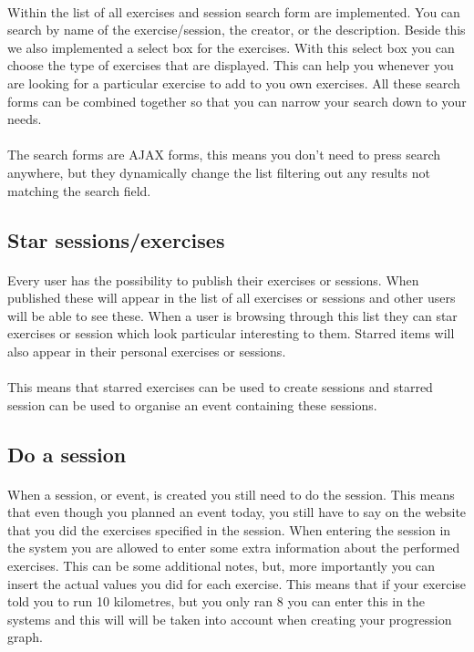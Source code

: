 \documentclass[11pt,a4paper]{scrartcl}
\begin{document}
\paragraph{}Within the list of all exercises and session search form are implemented. You can search by name of the exercise/session, the creator, or the description. Beside this we also implemented a select box for the exercises. With this select box you can choose the type of exercises that are displayed. This can help you whenever you are looking for a particular exercise to add to you own exercises. All these search forms can be combined together so that you can narrow your search down to your needs.
\paragraph{}The search forms are AJAX forms, this means you don't need to press search anywhere, but they dynamically change the list filtering out any results not matching the search field.

\subsection{Star sessions/exercises}
\paragraph{}Every user has the possibility to publish their exercises or sessions. When published these will appear in the list of all exercises or sessions and other users will be able to see these. When a user is browsing through this list they can star exercises or session which look particular interesting to them. Starred items will also appear in their personal exercises or sessions.
\paragraph{}This means that starred exercises can be used to create sessions and starred session can be used to organise an event containing these sessions.

\subsection{Do a session}
\paragraph{}When a session, or event, is created you still need to do the session. This means that even though you planned an event today, you still have to say on the website that you did the exercises specified in the session. When entering the session in the system you are allowed to enter some extra information about the performed exercises. This can be some additional notes, but, more importantly you can insert the actual values you did for each exercise. This means that if your exercise told you to run 10 kilometres, but you only ran 8 you can enter this in the systems and this will will be taken into account when creating your progression graph.
\end{document}
